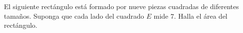 El siguiente rectángulo está formado por nueve piezas cuadradas de diferentes tamaños. Suponga que cada lado del cuadrado $E$ mide $7$. Halla el área del rectángulo.